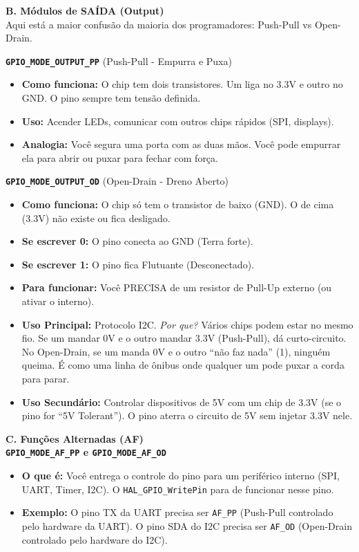 \documentclass[12pt,a4paper]{article}
\begin{document}
\vspace{0.3cm}
\noindent\textbf{B. Módulos de SAÍDA (Output)}\\
Aqui está a maior confusão da maioria dos programadores: Push-Pull vs Open-Drain.

\textbf{\texttt{GPIO\_MODE\_OUTPUT\_PP}} (Push-Pull - Empurra e Puxa)
\begin{itemize}
    \item \textbf{Como funciona:} O chip tem dois transistores. Um liga no 3.3V e outro no GND. O pino sempre tem tensão definida.
    \item \textbf{Uso:} Acender LEDs, comunicar com outros chips rápidos (SPI, displays).
    \item \textbf{Analogia:} Você segura uma porta com as duas mãos. Você pode empurrar ela para abrir ou puxar para fechar com força.
\end{itemize}

\textbf{\texttt{GPIO\_MODE\_OUTPUT\_OD}} (Open-Drain - Dreno Aberto)
\begin{itemize}
    \item \textbf{Como funciona:} O chip só tem o transistor de baixo (GND). O de cima (3.3V) não existe ou fica desligado.
    \item \textbf{Se escrever 0:} O pino conecta ao GND (Terra forte).
    \item \textbf{Se escrever 1:} O pino fica Flutuante (Desconectado).
    \item \textbf{Para funcionar:} Você PRECISA de um resistor de Pull-Up externo (ou ativar o interno).
    \item \textbf{Uso Principal:} Protocolo I2C. \textit{Por que?} Vários chips podem estar no mesmo fio. Se um mandar 0V e o outro mandar 3.3V (Push-Pull), dá curto-circuito. No Open-Drain, se um manda 0V e o outro ``não faz nada'' (1), ninguém queima. É como uma linha de ônibus onde qualquer um pode puxar a corda para parar.
    \item \textbf{Uso Secundário:} Controlar dispositivos de 5V com um chip de 3.3V (se o pino for ``5V Tolerant''). O pino aterra o circuito de 5V sem injetar 3.3V nele.
\end{itemize}

\vspace{0.3cm}
\noindent\textbf{C. Funções Alternadas (AF)}\\
\textbf{\texttt{GPIO\_MODE\_AF\_PP} e \texttt{GPIO\_MODE\_AF\_OD}}
\begin{itemize}
    \item \textbf{O que é:} Você entrega o controle do pino para um periférico interno (SPI, UART, Timer, I2C). O \texttt{HAL\_GPIO\_WritePin} para de funcionar nesse pino.
    \item \textbf{Exemplo:} O pino TX da UART precisa ser \texttt{AF\_PP} (Push-Pull controlado pelo hardware da UART). O pino SDA do I2C precisa ser \texttt{AF\_OD} (Open-Drain controlado pelo hardware do I2C).
\end{itemize}
\end{document}
